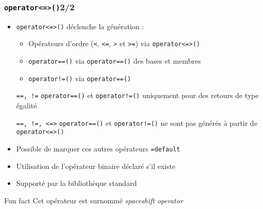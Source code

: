 \documentclass[C++.tex]{subfiles}
\begin{document}
\begin{frame}[fragile]
	\frametitle{\lstinline|operator<=>()|\titlehfill{}2/2}
	\begin{itemize}
		\item \lstinline|operator<=>()| déclenche la génération :
		\begin{itemize}
			\item Opérateurs d'ordre (\lstinline|<|, \lstinline|<=|, \lstinline|>| et \lstinline|>=|) via \lstinline|operator<=>()|
			\item \lstinline|operator==()| via \lstinline|operator==()| des bases et membres
			\item \lstinline|operator!=()| via \lstinline|operator==()|
		\end{itemize}

		\begin{block}{\lstinline|==, !=|}
			\lstinline|operator==()| et \lstinline|operator!=()| uniquement pour des retours de type \og égalité\fg{}
		\end{block}

		\begin{alertblock}{\lstinline|==, !=, <=>|}
			\lstinline|operator==()| et \lstinline|operator!=()| ne sont pas générés à partir de \lstinline|operator<=>()|
		\end{alertblock}


		\item Possible de marquer ces autres opérateurs \lstinline|=default|


		\item Utilisation de l'opérateur binaire déclaré s'il existe


		\item Supporté par la bibliothèque standard
	\end{itemize}

	\begin{block}{Fun fact}
		Cet opérateur est surnommé \og \textit{spaceshift operator}\fg{}
	\end{block}
\end{frame}
\end{document}
